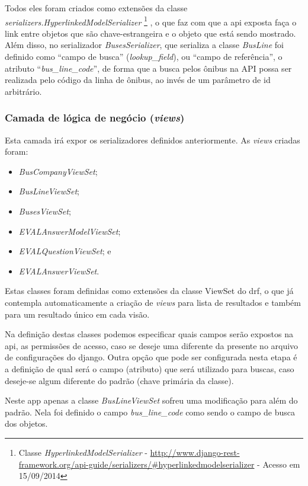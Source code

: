 Todos eles foram criados como extensões da classe \textit{serializers.HyperlinkedModelSerializer}%
\footnote{Classe \textit{HyperlinkedModelSerializer} - \url{http://www.django-rest-framework.org/api-guide/serializers/\#hyperlinkedmodelserializer} - Acesso em 15/09/2014}%
, o que faz com que a \gls{api} exposta faça o link entre objetos que são chave-estrangeira e o objeto que está sendo mostrado. Além disso, no serializador \textit{BusesSerializer}, que serializa a classe \textit{BusLine} foi definido como ``campo de busca'' (\textit{lookup\_field}), ou ``campo de referência'', o atributo ``\textit{bus\_line\_code}'', de forma que a busca pelos ônibus na API possa ser realizada pelo código da linha de ônibus, ao invés de um parâmetro de id arbitrário.

\subsubsection{Camada de lógica de negócio (\textit{views})}\label{subsubsec:eval-camada-view}
Esta camada irá expor os serializadores definidos anteriormente. As \textit{views} criadas foram: %
\begin{itemize}
    \item \textit{BusCompanyViewSet};
    \item \textit{BusLineViewSet};
    \item \textit{BusesViewSet};
    \item \textit{EVALAnswerModelViewSet};
    \item \textit{EVALQuestionViewSet}; e
    \item \textit{EVALAnswerViewSet}.
\end{itemize}

Estas classes foram definidas como extensões da classe ViewSet do \gls{drf}, o que já contempla automaticamente a criação de \textit{views} para lista de resultados e também para um resultado único em cada visão.

Na definição destas classes podemos especificar quais campos serão expostos na \gls{api}, as permissões de acesso, caso se deseje uma diferente da presente no arquivo de configurações do \gls{django}. Outra opção que pode ser configurada nesta etapa é a definição de qual será o campo (atributo) que será utilizado para buscas, caso deseje-se algum diferente do padrão (chave primária da classe).

Neste app apenas a classe \textit{BusLineViewSet} sofreu uma modificação para além do padrão. Nela foi definido o campo \textit{bus\_line\_code} como sendo o campo de busca dos objetos.

